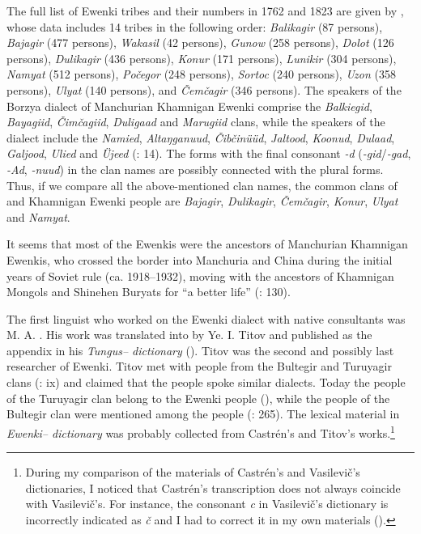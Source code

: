 \documentclass[output=paper,colorlinks,citecolor=brown]{langscibook}
\begin{document}
The full list of  Ewenki tribes and their numbers in 1762 and 1823 are given by \citet[93]{Tugolukov1975}, whose data includes 14 tribes in the following order: \textit{Balikagir} (87 persons), \textit{Bajagir} (477 persons), \textit{Wakasil} (42 persons), \textit{Gunow} (258 persons), \textit{Dolot} (126 persons), \textit{Dulikagir} (436 persons), \textit{Konur} (171 persons), \textit{Lunikir} (304 persons), \textit{Namyat} (512 persons), \textit{Počegor} (248 persons), \textit{Sortoc} (240 persons), \textit{Uzon} (358 persons), \textit{Ulyat} (140 persons), and \textit{Čemčagir} (346 persons). The speakers of the Borzya dialect of Manchurian Khamnigan Ewenki comprise the \textit{Balkiegid}, \textit{Bayagiid}, \textit{Čimčagiid}, \textit{Duligaad} and \textit{Marugiid} clans, while the speakers of the  dialect include the \textit{Namied}, \textit{Altaŋganuud}, \textit{Čibčinüüd}, \textit{Jaltood}, \textit{Koonud}, \textit{Dulaad}, \textit{Galjood}, \textit{Ulied} and \textit{Üjeed} (\citealt{Janhunen1991}: 14). The forms with the final consonant \textit{-d} (\textit{-gid}/\textit{-gad}, \textit{-Ad}, \textit{-nuud}) in the clan names are possibly connected with the  plural forms. Thus, if we compare all the above-mentioned clan names, the common clans of  and Khamnigan Ewenki people are \textit{Bajagir}, \textit{Dulikagir}, \textit{Čemčagir}, \textit{Konur}, \textit{Ulyat} and \textit{Namyat}.

It seems that most of the  Ewenkis were the ancestors of Manchurian Khamnigan Ewenkis, who crossed the border into Manchuria and China during the initial years of Soviet rule (ca. 1918--1932), moving with the ancestors of Khamnigan Mongols and Shinehen Buryats for “a better life” (\citealt{Janhunen1997}: 130).

\begin{sloppypar}
The first linguist who worked on the  Ewenki dialect with native consultants was M. A. \citet{Castrén1856}. His work was translated into  by Ye. I. Titov and published as the appendix in his \textit{Tungus– dictionary} (\citealt{Titov1926}). Titov was the second and possibly last researcher of  Ewenki. Titov met with people from the Bultegir and Turuyagir clans (\citealt{Titov1926}: ix) and claimed that the people spoke similar dialects. Today the people of the Turuyagir clan belong to the  Ewenki people (\citealt[29]{Khabtagaeva2017}), while the people of the Bultegir clan were mentioned among the  people (\citealt{Vasilevic1969}: 265). The lexical material in  \textit{Ewenki– dictionary} was probably collected from Castrén’s and Titov’s works.\footnote{During my comparison of the materials of Castrén’s and Vasilevič’s dictionaries, I noticed that Castrén’s transcription does not always coincide with Vasilevič’s. For instance, the consonant \textit{c} in Vasilevič’s dictionary is incorrectly indicated as \textit{č} and I had to correct it in my own materials (\citealt{Khabtagaeva2017}).}
\end{sloppypar}
\end{document}
